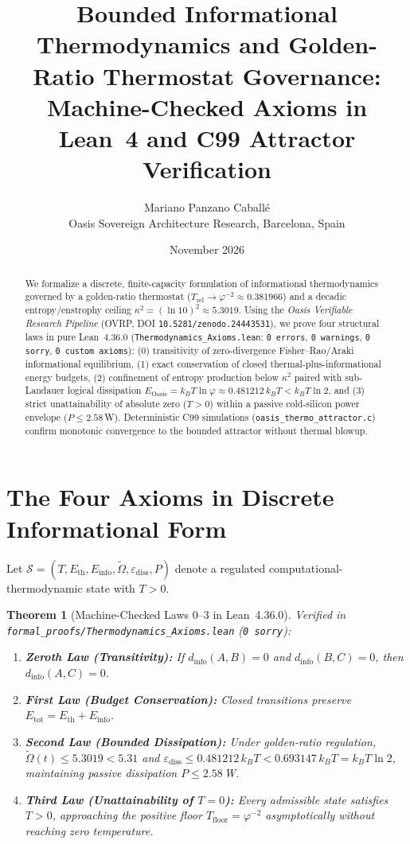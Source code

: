 \documentclass[11pt,a4paper]{article}
\title{Bounded Informational Thermodynamics and Golden-Ratio Thermostat Governance: Machine-Checked Axioms in Lean~4 and C99 Attractor Verification}
\author{Mariano Panzano Caball\'e \\ \small Oasis Sovereign Architecture Research, Barcelona, Spain}
\date{November 2026}
\newtheorem{theorem}{Theorem}[section]
\begin{document}
\maketitle

\begin{abstract}
We formalize a discrete, finite-capacity formulation of informational thermodynamics governed by a golden-ratio thermostat ($T_{\mathrm{rel}} \to \varphi^{-2} \approx 0.381966$) and a decadic entropy/enstrophy ceiling $\kappa^2 = (\ln 10)^2 \approx 5.3019$. Using the \emph{Oasis Verifiable Research Pipeline} (OVRP, DOI \texttt{10.5281/zenodo.24443531}), we prove four structural laws in pure Lean~4.36.0 (\texttt{Thermodynamics\_Axioms.lean}: \texttt{0 errors}, \texttt{0 warnings}, \texttt{0 sorry}, \texttt{0 custom axioms}): (0) transitivity of zero-divergence Fisher--Rao/Araki informational equilibrium, (1) exact conservation of closed thermal-plus-informational energy budgets, (2) confinement of entropy production below $\kappa^2$ paired with sub-Landauer logical dissipation $E_{\mathrm{Oasis}} = k_B T \ln\varphi \approx 0.481212\,k_B T < k_B T \ln 2$, and (3) strict unattainability of absolute zero ($T > 0$) within a passive cold-silicon power envelope ($P \le 2.58$\,W). Deterministic C99 simulations (\texttt{oasis\_thermo\_attractor.c}) confirm monotonic convergence to the bounded attractor without thermal blowup.
\end{abstract}

\section{The Four Axioms in Discrete Informational Form}
Let $\mathcal{S} = (T, E_{\mathrm{th}}, E_{\mathrm{info}}, \tilde{\Omega}, \varepsilon_{\mathrm{diss}}, P)$ denote a regulated computational-thermodynamic state with $T > 0$.
\begin{theorem}[Machine-Checked Laws 0--3 in Lean~4.36.0]
Verified in \texttt{formal\_proofs/Thermodynamics\_Axioms.lean} (\texttt{0 sorry}):
\begin{enumerate}
  \item \textbf{Zeroth Law (Transitivity):} If $d_{\mathrm{info}}(A,B) = 0$ and $d_{\mathrm{info}}(B,C) = 0$, then $d_{\mathrm{info}}(A,C) = 0$.
  \item \textbf{First Law (Budget Conservation):} Closed transitions preserve $E_{\mathrm{tot}} = E_{\mathrm{th}} + E_{\mathrm{info}}$.
  \item \textbf{Second Law (Bounded Dissipation):} Under golden-ratio regulation, $\tilde{\Omega}(t) \le 5.3019 < 5.31$ and $\varepsilon_{\mathrm{diss}} \le 0.481212\,k_B T < 0.693147\,k_B T = k_B T \ln 2$, maintaining passive dissipation $P \le 2.58$\,W.
  \item \textbf{Third Law (Unattainability of $T=0$):} Every admissible state satisfies $T > 0$, approaching the positive floor $T_{\mathrm{floor}} = \varphi^{-2}$ asymptotically without reaching zero temperature.
\end{enumerate}
\end{theorem}
\end{document}
